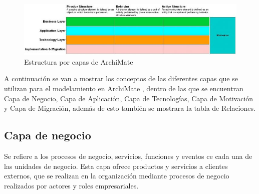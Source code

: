 \begin{figure} [h]
	\centering
	\includegraphics[width=0.7\linewidth]{arquitectura/imagenes/Archimate}
	\caption{Estructura por capas de ArchiMate \cite{togaf1}}
	\label{fig:archimate}
\end{figure}

A continuación se van a mostrar los conceptos de las diferentes capas que se utilizan para el modelamiento en ArchiMate \cite{togaf4}, dentro de las que se encuentran Capa de Negocio, Capa de Aplicación, Capa de Tecnologías, Capa de Motivación y Capa de Migración, además de esto también se mostrara la tabla de Relaciones.

\newpage

\subsection{Capa de negocio}

Se refiere a los procesos de negocio, servicios, funciones y eventos ce cada una de las unidades de negocio. Esta capa ofrece productos y servicios a clientes externos, que se realizan en la organización mediante procesos de negocio realizados por actores y roles empresariales.

